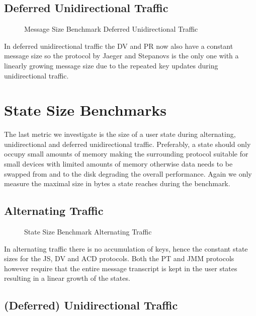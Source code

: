 \documentclass[11pt,a4paper,twoside,openright,bibliography=totoc]{scrbook}
\begin{document}
\subsection{Deferred Unidirectional Traffic}
\label{sec:deferr-unid-traff}

\begin{figure}[H]
  \centering
   
  \caption{Message Size Benchmark Deferred Unidirectional Traffic}
  \label{fig:msg-size-def}
\end{figure}

In deferred unidirectional traffic the DV and PR now also
have a constant message size so the protocol by
Jaeger and Stepanovs is the only one with a linearly
growing message size due to the repeated key updates
during unidirectional traffic.

\section{State Size Benchmarks}
\label{sec:state-size-benchm}

The last metric we investigate is the size of a user state during
alternating, unidirectional and deferred unidirectional
traffic. Preferably, a state should only occupy small amounts of
memory making the surrounding protocol suitable for small devices with
limited amounts of memory otherwise data needs to be swapped from and
to the disk degrading the overall performance. Again we only
measure the maximal size in bytes a state reaches during the benchmark.

\subsection{Alternating Traffic}
\label{sec:alternating-traffic-2}

\begin{figure}[H]
  \centering
   
  \caption{State Size Benchmark Alternating Traffic}
  \label{fig:state-size-alt}
\end{figure}

In alternating traffic there is no accumulation of keys,
hence the constant state sizes for the JS, DV and ACD protocols.
Both the PT and JMM protocols however require that the
entire message transcript is kept in the user states
resulting in a linear growth of the states.

\subsection{(Deferred) Unidirectional Traffic}
\label{sec:unid-traff-2}
\end{document}

